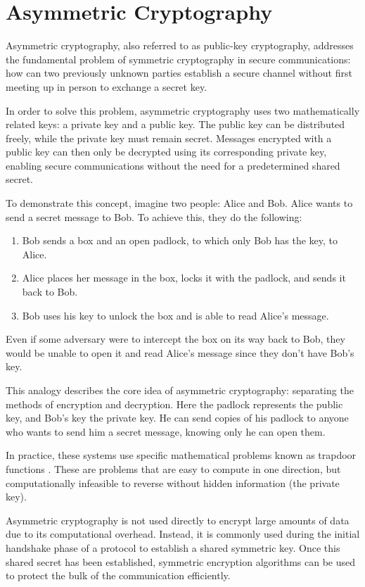 \section{Asymmetric Cryptography}
Asymmetric cryptography, also referred to as public-key cryptography, addresses the fundamental problem of symmetric cryptography in secure communications: how can two previously unknown parties establish a secure channel without first meeting up in person to exchange a secret key. 

In order to solve this problem, asymmetric cryptography uses two mathematically related keys: a private key and a public key. The public key can be distributed freely, while the private key must remain secret. Messages encrypted with a public key can then only be decrypted using its corresponding private key, enabling secure communications without the need for a predetermined shared secret.

To demonstrate this concept, imagine two people: Alice and Bob. Alice wants to send a secret message to Bob. To achieve this, they do the following: 
\begin{enumerate}
    \item Bob sends a box and an open padlock, to which only Bob has the key, to Alice.
    \item Alice places her message in the box, locks it with the padlock, and sends it back to Bob.
    \item Bob uses his key to unlock the box and is able to read Alice's message.
\end{enumerate}
Even if some adversary were to intercept the box on its way back to Bob, they would be unable to open it and read Alice's message since they don't have Bob's key.

This analogy describes the core idea of asymmetric cryptography: separating the methods of encryption and decryption. Here the padlock represents the public key, and Bob's key the private key. He can send copies of his padlock to anyone who wants to send him a secret message, knowing only he can open them.

In practice, these systems use specific mathematical problems known as trapdoor functions \cite{trapdoor}. These are problems that are easy to compute in one direction, but computationally infeasible to reverse without hidden information (the private key).

Asymmetric cryptography is not used directly to encrypt large amounts of data due to its computational overhead. Instead, it is commonly used during the initial handshake phase of a protocol to establish a shared symmetric key. Once this shared secret has been established, symmetric encryption algorithms can be used to protect the bulk of the communication efficiently.


